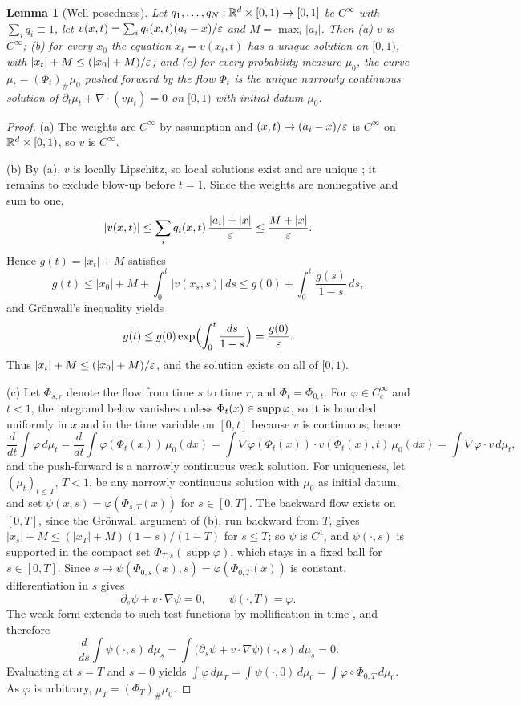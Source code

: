 \documentclass{article} %
\theoremstyle{plain}
\newtheorem{lemma}[theorem]{Lemma}
\theoremstyle{definition}
\theoremstyle{remark}
\begin{document}
\begin{lemma}[Well-posedness]
\label{lem:wellposed}
Let $q_1,\dots,q_N:\mathbb{R}^d\times[0,1)\to[0,1]$ be $C^\infty$ with $\sum_iq_i\equiv1$, let
$v(x,t)=\sum_iq_i(x,t)(a_i-x)/\varepsilon$ and $M=\max_i|a_i|$. Then (a) $v$ is $C^\infty$; (b) for
every $x_0$ the equation $\dot x_t=v(x_t,t)$ has a unique solution on $[0,1)$, with
$|x_t|+M\le(|x_0|+M)/\varepsilon$; and (c) for every probability measure $\mu_0$, the curve
$\mu_t=(\Phi_t)_\#\mu_0$ pushed forward by the flow $\Phi_t$ is the unique narrowly continuous
solution of $\partial_t\mu_t+\nabla\!\cdot(v\mu_t)=0$ on $[0,1)$ with initial datum $\mu_0$.
\end{lemma}
\begin{proof}
(a) The weights are $C^\infty$ by assumption and $(x,t)\mapsto(a_i-x)/\varepsilon$ is $C^\infty$ on
$\mathbb{R}^d\times[0,1)$, so $v$ is $C^\infty$.

(b) By (a), $v$ is locally Lipschitz, so local solutions exist and are unique
\citep[Ch.~II]{hartman2002ode}; it remains to exclude blow-up before $t=1$. Since the weights are
nonnegative and sum to one,
\[
|v(x,t)|\le\sum_iq_i(x,t)\,\frac{|a_i|+|x|}{\varepsilon}\le\frac{M+|x|}{\varepsilon}.
\]
Hence $g(t)=|x_t|+M$ satisfies
\[
g(t)\le|x_0|+M+\int_0^t|v(x_s,s)|\,ds\le g(0)+\int_0^t\frac{g(s)}{1-s}\,ds,
\]
and Gr\"onwall's inequality yields
\[
g(t)\le g(0)\exp\Bigl(\int_0^t\frac{ds}{1-s}\Bigr)=\frac{g(0)}{\varepsilon}.
\]
Thus $|x_t|+M\le(|x_0|+M)/\varepsilon$, and the solution exists on all of $[0,1)$.

(c) Let $\Phi_{s,r}$ denote the flow from time $s$ to time $r$, and $\Phi_t=\Phi_{0,t}$. For
$\varphi\in C_c^\infty$ and $t<1$, the integrand below vanishes unless $\Phi_t(x)\in\operatorname{supp}\varphi$,
so it is bounded uniformly in $x$ and in the time variable on $[0,t]$ because $v$ is continuous;
hence
\[
\frac{d}{dt}\int\varphi\,d\mu_t=\frac{d}{dt}\int\varphi(\Phi_t(x))\,\mu_0(dx)
=\int\nabla\varphi(\Phi_t(x))\cdot v(\Phi_t(x),t)\,\mu_0(dx)=\int\nabla\varphi\cdot v\,d\mu_t,
\]
and the push-forward is a narrowly continuous weak solution. For uniqueness, let
$(\mu_t)_{t\le T}$, $T<1$, be any narrowly continuous solution with $\mu_0$ as initial datum, and set
$\psi(x,s)=\varphi(\Phi_{s,T}(x))$ for $s\in[0,T]$. The backward flow exists on $[0,T]$, since the Gr\"onwall
argument of (b), run backward from $T$, gives $|x_s|+M\le(|x_T|+M)(1-s)/(1-T)$ for $s\le T$; so
$\psi$ is $C^1$, and $\psi(\cdot,s)$ is supported in the compact set
$\Phi_{T,s}(\operatorname{supp}\varphi)$, which stays in a fixed ball for $s\in[0,T]$. Since
$s\mapsto\psi(\Phi_{0,s}(x),s)=\varphi(\Phi_{0,T}(x))$ is constant, differentiation in $s$ gives
\[
\partial_s\psi+v\cdot\nabla\psi=0,\qquad\psi(\cdot,T)=\varphi .
\]
The weak form extends to such test functions by mollification in time
\citep[Ch.~8]{ambrosio2008gradient}, and therefore
\[
\frac{d}{ds}\int\psi(\cdot,s)\,d\mu_s=\int\bigl(\partial_s\psi+v\cdot\nabla\psi\bigr)(\cdot,s)\,d\mu_s=0 .
\]
Evaluating at $s=T$ and $s=0$ yields
$\int\varphi\,d\mu_T=\int\psi(\cdot,0)\,d\mu_0=\int\varphi\circ\Phi_{0,T}\,d\mu_0$. As $\varphi$ is
arbitrary, $\mu_T=(\Phi_T)_\#\mu_0$.
\end{proof}
\end{document}
